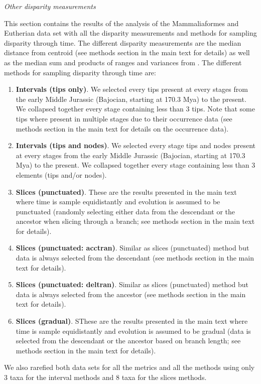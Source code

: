 \documentclass[12pt,letterpaper]{article}
\renewcommand{\subsection}[1]{%
\bigskip
\begin{center}
\begin{large}
\normalfont\itshape #1
\end{large}
\end{center}}
\begin{document}
\subsection{Other disparity measurements}
This section contains the results of the analysis of the Mammaliaformes and Eutherian data set with all the disparity measurements and methods for sampling disparity through time.
The different disparity measurements are the median distance from centroid (see methods section in the main text for details) as well as the median sum and products of ranges and variances from \cite{Wills1994}.
The different methods for sampling disparity through time are:
\begin{enumerate}
\item \textbf{Intervals (tips only)}. We selected every tips present at every stages from the early Middle Jurassic (Bajocian, starting at 170.3 Mya) to the present. We collapsed together every stage containing less than 3 tips. Note that some tips where present in multiple stages due to their occurrence data (see methods section in the main text for details on the occurrence data).
\item \textbf{Intervals (tips and nodes)}. We selected every stage tips and nodes present at every stages from the early Middle Jurassic (Bajocian, starting at 170.3 Mya) to the present. We collapsed together every stage containing less than 3 elements (tips and/or nodes).
\item \textbf{Slices (punctuated)}. These are the results presented in the main text where time is sample equidistantly and evolution is assumed to be punctuated (randomly selecting either data from the descendant or the ancestor when slicing through a branch; see methods section in the main text for details).
\item \textbf{Slices (punctuated: acctran)}. Similar as slices (punctuated) method but data is always selected from the descendant (see methods section in the main text for details).
\item \textbf{Slices (punctuated: deltran)}. Similar as slices (punctuated) method but data is always selected from the ancestor (see methods section in the main text for details).
\item \textbf{Slices (gradual)}. SThese are the results presented in the main text where time is sample equidistantly and evolution is assumed to be gradual (data is selected from the descendant or the ancestor based on branch length; see methods section in the main text for details).
\end{enumerate}
We also rarefied both data sets for all the metrics and all the methods using only 3 taxa for the interval methods and 8 taxa for the slices methods.
\end{document}
